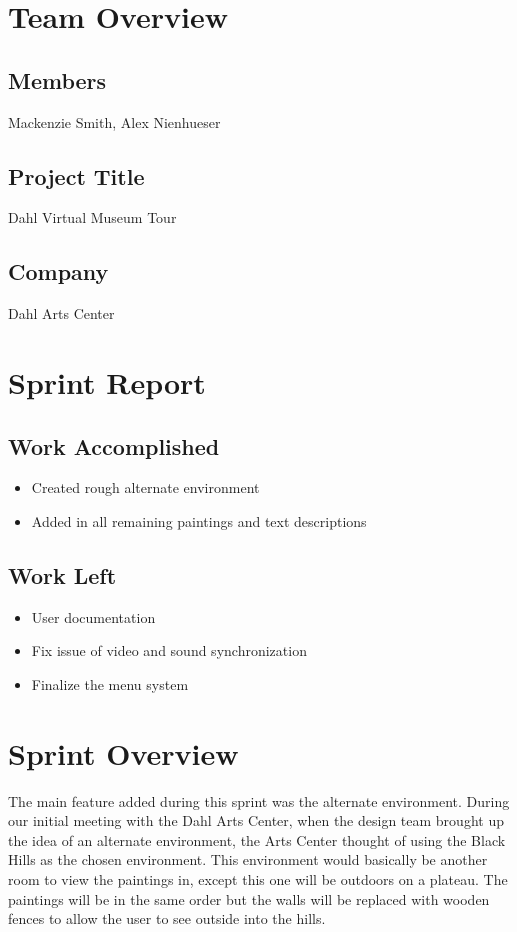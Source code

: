 \documentclass[11pt]{book}
\begin{document}
\section*{Team Overview}
\hrulefill
\subsection*{Members}
Mackenzie Smith, Alex Nienhueser

\subsection*{Project Title}
Dahl Virtual Museum Tour

\subsection*{Company}
Dahl Arts Center


\section*{Sprint Report}

\hrulefill
\subsection*{Work Accomplished}
\begin{itemize}
\item Created rough alternate environment
\item Added in all remaining paintings and text descriptions


\end{itemize}
\subsection*{Work Left}
\begin{itemize}
\item User documentation
\item Fix issue of video and sound synchronization
\item Finalize the menu system
\end{itemize}

\section*{Sprint Overview}
The main feature added during this sprint was the alternate environment.  During our initial meeting with the Dahl Arts Center, when the design team brought up the idea of an alternate environment, the Arts Center thought of using the Black Hills as the chosen environment.  This environment would basically be another room to view the paintings in, except this one will be outdoors on a plateau.  The paintings will be in the same order but the walls will be replaced with wooden fences to allow the user to see outside into the hills.
\end{document}
